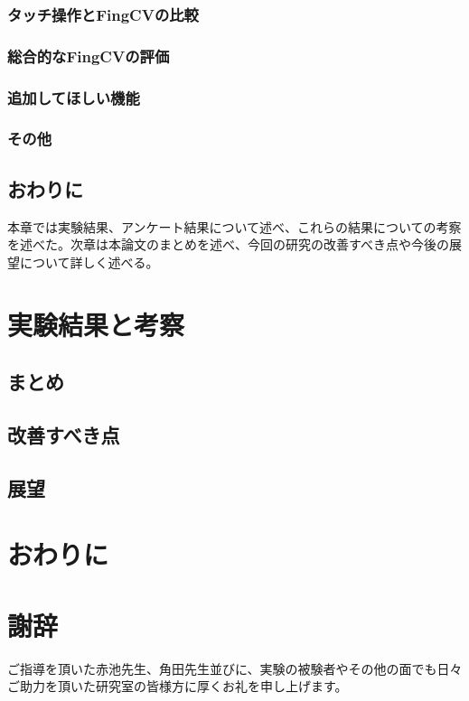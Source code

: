 \documentclass[11pt,a4j, titlepage]{jarticle} %
\begin{document}
\subsubsection{タッチ操作とFingCVの比較}


\subsubsection{総合的なFingCVの評価}


\subsubsection{追加してほしい機能}


\subsubsection{その他}


\subsection{おわりに}
本章では実験結果、アンケート結果について述べ、これらの結果についての考察を述べた。次章は本論文のまとめを述べ、今回の研究の改善すべき点や今後の展望について詳しく述べる。

\newpage
\section{実験結果と考察}
\subsection{まとめ}


\subsection{改善すべき点}


\subsection{展望}

\newpage
\section{おわりに}


\section*{謝辞}
ご指導を頂いた赤池先生、角田先生並びに、実験の被験者やその他の面でも日々ご助力を頂いた研究室の皆様方に厚くお礼を申し上げます。
\end{document}
